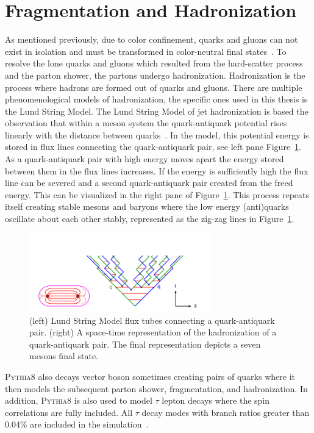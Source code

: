 \section{Fragmentation and Hadronization}
As mentioned previously, due to color confinement, quarks and gluons can not exist in isolation
and must be transformed in color-neutral final states~\cite{Hoche:2014rga}. 
To resolve the lone quarks and gluons which resulted from the hard-scatter process and the parton 
shower, the partons undergo hadronization. Hadronization is the process where hadrons are formed 
out of quarks and gluons. There are multiple phenomenological models of hadronization, the
specific ones used in this thesis is the Lund String Model. The Lund String Model of jet
hadronization is based the observation that within a meson system the quark-antiquark 
potential rises linearly with the distance between quarks~\cite{Bali:1992ab}. In the model, this
potential energy is stored in flux lines connecting the quark-antiquark pair, see left pane 
Figure~\ref{fig:sim_lund_string}. As a quark-antiquark 
pair with high energy moves apart the energy stored between them in the flux lines increases. If the energy
is sufficiently high the flux line can be severed and a second quark-antiquark pair created from
the freed energy. This can be visualized in the right pane of Figure~\ref{fig:sim_lund_string}.
This process repeats itself creating stable mesons and baryons where the low energy (anti)quarks
oscillate about each other stably, represented as the zig-zag lines in Figure~\ref{fig:sim_lund_string}.

\begin{figure}[htbp]
\centering
     \includegraphics[width=0.7\textwidth]{simulation/plots/lund_time-space.png}
     \caption{
(left) Lund String Model flux tubes connecting a quark-antiquark pair. (right) A
space-time representation of the hadronization of a quark-antiquark pair. 
The final representation depicts a seven mesons final state.
     }
     \label{fig:sim_lund_string}
\end{figure}

\textsc{Pythia8} also decays vector boson sometimes creating pairs of quarks where
it then models the subsequent parton shower, fragmentation, and hadronization.
In addition, \textsc{Pythia8} is also used to model $\tau$ lepton decays where the spin
correlations are fully included. All $\tau$ decay modes with branch ratios greater than 0.04\%
are included in the simulation~\cite{ILTEN201477}.



